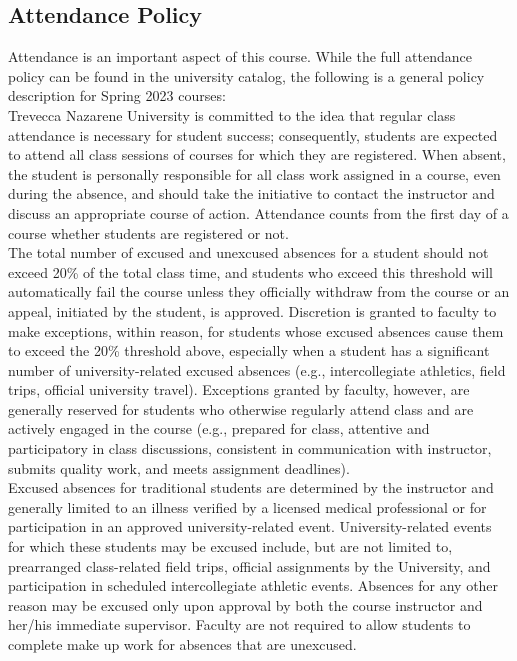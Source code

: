 \documentclass[11pt]{article}
\begin{document}
\subsection*{Attendance Policy}
Attendance is an important aspect of this course. While the full attendance policy can be found in the university catalog, the following is a general policy description for Spring 2023 courses:\\

Trevecca Nazarene University is committed to the idea that regular class attendance is necessary for student success; consequently, students are expected to attend all class sessions of courses for which they are registered. When absent, the student is personally responsible for all class work assigned in a course, even during the absence, and should take the initiative to contact the instructor and discuss an appropriate course of action. Attendance counts from the first day of a course whether students are registered or not.\\

The total number of excused and unexcused absences for a student should not exceed 20\% of the total class time, and students who exceed this threshold will automatically fail the course unless they officially withdraw from the course or an appeal, initiated by the student, is approved. Discretion is granted to faculty to make exceptions, within reason, for students whose excused absences cause them to exceed the 20\% threshold above, especially when a student has a significant number of university-related excused absences (e.g., intercollegiate athletics, field trips, official university travel). Exceptions granted by faculty, however, are generally reserved for students who otherwise regularly attend class and are actively engaged in the course (e.g., prepared for class, attentive and participatory in class discussions, consistent in communication with instructor, submits quality work, and meets assignment deadlines).\\

Excused absences for traditional students are determined by the instructor and generally limited to an illness verified by a licensed medical professional or for participation in an approved university-related event. University-related events for which these students may be excused include, but are not limited to, prearranged class-related field trips, official assignments by the University, and participation in scheduled intercollegiate athletic events. Absences for any other reason may be excused only upon approval by both the course instructor and her/his immediate supervisor. Faculty are not required to allow students to complete make up work for absences that are unexcused.\\
\end{document}
